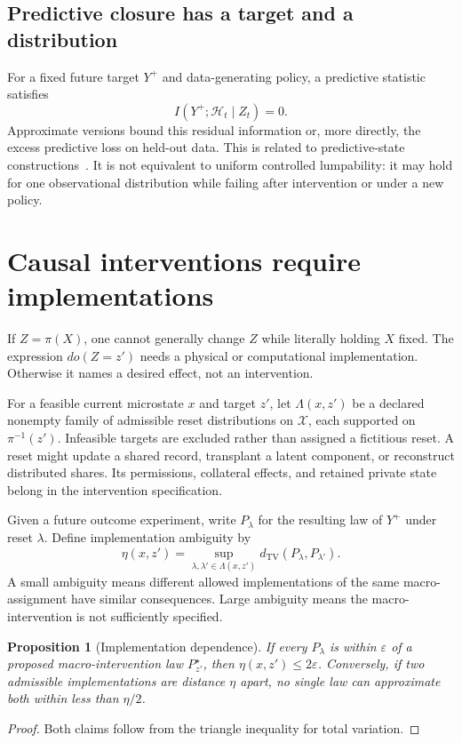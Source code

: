 \documentclass[11pt,letterpaper]{article}
\theoremstyle{plain}
\newtheorem{proposition}{Proposition}[section]
\theoremstyle{definition}
\theoremstyle{remark}
\newcommand{\TV}{d_{\mathrm{TV}}}
\newcommand{\X}{\mathcal X}
\newcommand{\Hist}{\mathcal H}
\begin{document}
\subsection{Predictive closure has a target and a distribution}
For a fixed future target $Y^+$ and data-generating policy, a predictive statistic satisfies
\[
I(Y^+;\Hist_t\mid Z_t)=0.
\]
Approximate versions bound this residual information or, more directly, the excess predictive loss on held-out data. This is related to predictive-state constructions~\cite{shalizi}. It is not equivalent to uniform controlled lumpability: it may hold for one observational distribution while failing after intervention or under a new policy.

\section{Causal interventions require implementations}\label{sec:causal}
If $Z=\pi(X)$, one cannot generally change $Z$ while literally holding $X$ fixed. The expression $do(Z=z')$ needs a physical or computational implementation. Otherwise it names a desired effect, not an intervention.

For a feasible current microstate $x$ and target $z'$, let $\Lambda(x,z')$ be a declared nonempty family of admissible reset distributions on $\X$, each supported on $\pi^{-1}(z')$. Infeasible targets are excluded rather than assigned a fictitious reset. A reset might update a shared record, transplant a latent component, or reconstruct distributed shares. Its permissions, collateral effects, and retained private state belong in the intervention specification.

Given a future outcome experiment, write $P_\lambda$ for the resulting law of $Y^+$ under reset $\lambda$. Define implementation ambiguity by
\[
\eta(x,z')=\sup_{\lambda,\lambda'\in\Lambda(x,z')}
\TV(P_\lambda,P_{\lambda'}).
\]
A small ambiguity means different allowed implementations of the same macro-assignment have similar consequences. Large ambiguity means the macro-intervention is not sufficiently specified.

\begin{proposition}[Implementation dependence]\label{prop:lift}
If every $P_\lambda$ is within $\varepsilon$ of a proposed macro-intervention law $P^\star_{z'}$, then $\eta(x,z')\leq2\varepsilon$. Conversely, if two admissible implementations are distance $\eta$ apart, no single law can approximate both within less than $\eta/2$.
\end{proposition}
\begin{proof}
Both claims follow from the triangle inequality for total variation.
\end{proof}
\end{document}

